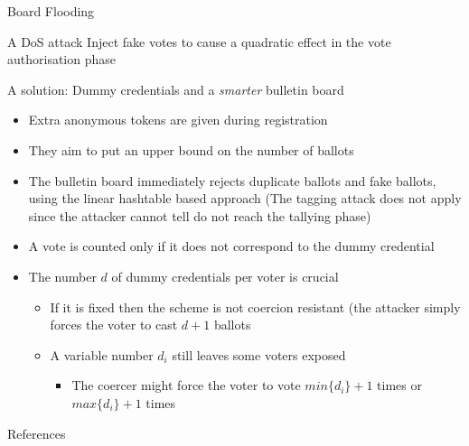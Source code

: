 \documentclass{beamer}
\begin{document}
\begin{frame}{Board Flooding}
\begin{block}{A DoS attack}
Inject fake votes to cause a quadratic effect in the vote authorisation phase 
\end{block}
A solution: Dummy credentials and a \textit{smarter} bulletin board
\begin{itemize}
\item Extra anonymous tokens are given during registration
\item They aim to put an upper bound on the number of ballots
\item The bulletin board immediately rejects duplicate ballots and fake ballots, using the linear hashtable based approach (The tagging attack does not apply since the attacker cannot tell do not reach the tallying phase)
\item A vote is counted only if it does not correspond to the dummy credential
\item The number $d$ of dummy credentials per voter is crucial
\begin{itemize}
\item If it is fixed then the scheme is not coercion resistant (the attacker simply forces the voter to cast $d+1$ ballots
\item A variable number $d_i$ still leaves some voters exposed
\begin{itemize}
\item The coercer might force the voter to vote $min \{d_i\} + 1$ times or $max\{d_i\} + 1$ times
\end{itemize}
\end{itemize}
\end{itemize}
\end{frame}

\begin{frame}[allowframebreaks]{References}
\begin{small}
\nocite{*}


\end{small}
\end{frame}

 
\end{document}
